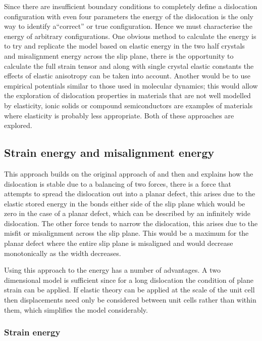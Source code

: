 

Since there are insufficient boundary conditions to completely define a dislocation configuration with even four parameters the energy of the dislocation is the only way to identify a``correct'' or true configuration. Hence we must characterise the energy of arbitrary configurations. One obvious method to calculate the energy is to try and replicate the model based on elastic energy in the two half crystals and misalignment energy across the slip plane, there is the opportunity to calculate the full strain tensor and along with single crystal elastic constants the effects of elastic anisotropy can be taken into account. Another would be to use empirical potentials similar to those used in molecular dynamics; this would allow the exploration of dislocation properties in materials that are not well modelled by elasticity, ionic solids or compound semiconductors are examples of materials where elasticity is probably less appropriate. Both of these approaches are explored.

\subsection{Strain energy and misalignment energy}

This approach builds on the original approach of \citet{Peierls1940} and then \citet{Nabarro1947} and explains how the dislocation is stable due to a balancing of two forces, there is a force that attempts to spread the dislocation out into a planar defect, this arises due to the elastic stored energy in the bonds either side of the slip plane which would be zero in the case of a planar defect, which can be described by an infinitely wide dislocation. The other force tends to narrow the dislocation, this arises due to the misfit or misalignment across the slip plane. This would be a maximum for the planar defect where the entire slip plane is misaligned and would decrease monotonically as the width decreases.

Using this approach to the energy has a number of advantages. A two dimensional model is sufficient since for a long dislocation the condition of plane strain can be applied. If elastic theory can be applied at the scale of the unit cell then displacements need only be considered between unit cells rather than within them, which simplifies the model considerably.

\subsubsection{Strain energy}


